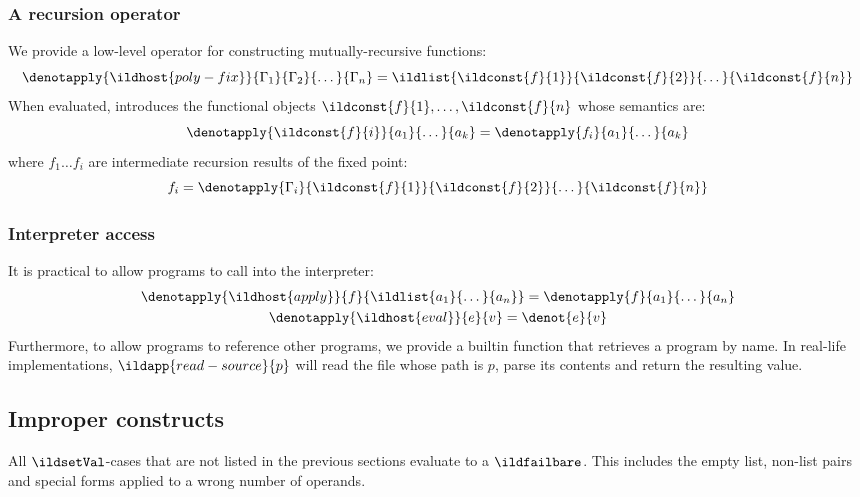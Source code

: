 \subsubsection{A recursion operator}
We provide a low-level operator  for constructing
mutually-recursive functions:
\begin{equation}
  \denotapply{\ildhost{poly-fix}}{\Gamma_1}{\Gamma_2}{\dots}{\Gamma_n} = \ildlist{\ildconst{f}{1}}{\ildconst{f}{2}}{\dots}{\ildconst{f}{n}}
\end{equation}
When evaluated,  introduces the functional objects \(\ildconst{f}{1}, \dots, \ildconst{f}{n}\) whose semantics are:
\begin{equation}
  \denotapply{\ildconst{f}{i}}{a_1}{\dots}{a_k}
  = \denotapply{f_i}{a_1}{\dots}{a_k}
\end{equation}
where \( f_1 \dots f_i \) are intermediate recursion results of the fixed point:
\begin{equation}
  f_i = \denotapply{\Gamma_i}{\ildconst{f}{1}}{\ildconst{f}{2}}{\dots}{\ildconst{f}{n}}
\end{equation}
\subsubsection{Interpreter access}
It is practical to allow programs to call into the interpreter:
\begin{equation}\begin{gathered}
  \denotapply{\ildhost{apply}}{f}{\ildlist{a_1}{\dots}{a_n}} = \denotapply{f}{a_1}{\dots}{a_n}\\
  \denotapply{\ildhost{eval}}{e}{v} = \denot{e}{v}
\end{gathered}\end{equation}
Furthermore, to allow programs to reference other programs, we provide
a builtin function  that retrieves a program by name.
In real-life implementations, \(\ildapp{read-source}{p}\) will read
the file whose path is \(p\), parse its contents and return the resulting value.
\subsection{Improper constructs}
All \(\ildsetVal\)-cases that are not listed in the previous sections evaluate
to a \(\ildfailbare\). This includes the empty list, non-list pairs and special forms
applied to a wrong number of operands.
